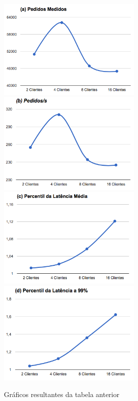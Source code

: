 \begin{figure}[ht!]
\centering
\includegraphics[width=70mm]{img/final1/a}
\includegraphics[width=70mm]{img/final1/b}
\includegraphics[width=70mm]{img/final1/c}
\includegraphics[width=70mm]{img/final1/d}
\caption{Gráficos resultantes da tabela anterior}
\end{figure}

